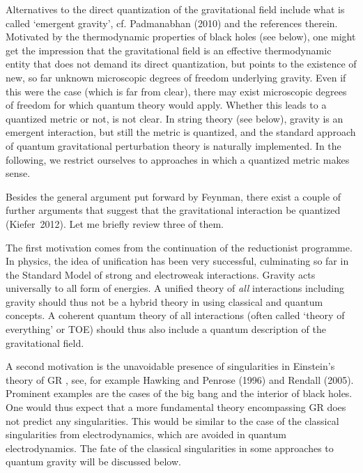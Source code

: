 \documentclass[12pt]{article}
\begin{document}
Alternatives to the direct quantization of the gravitational field
include what is called `emergent gravity', cf. Padmanabhan (2010) and
the references therein. Motivated by the thermodynamic properties of
black holes (see below), one might get the impression that the
gravitational field is an effective thermodynamic entity that does
not demand its direct quantization, but points to the existence of
new, so far unknown microscopic degrees of freedom underlying
gravity. Even if this were the case (which is far from clear), there
may exist microscopic degrees of freedom for which quantum theory
would apply. Whether this leads to a quantized metric or not, is not
clear. In string theory (see below), gravity is an
emergent interaction, but still the metric is quantized, and the standard
approach of quantum 
gravitational perturbation theory is naturally implemented.  
In the following, we restrict ourselves to approaches in which a
quantized metric makes sense.

Besides the general argument put forward by Feynman, there exist a
couple of further arguments that suggest that the gravitational interaction
be quantized (Kiefer~2012). Let me briefly review three of them.

The first motivation comes from the continuation of the reductionist
programme. In physics, the idea of unification has been very
successful, culminating so far in the Standard Model of strong and
electroweak interactions. Gravity acts universally to all form of
energies. A unified theory of {\em all} interactions including gravity
should thus not be a hybrid theory in using classical and quantum
concepts. A coherent quantum theory of all interactions (often called
`theory of everything' or TOE) should thus also include a quantum
description of the gravitational field. 

A second motivation is the unavoidable presence of singularities in
Einstein's theory of GR , see, for example Hawking and Penrose (1996)
and Rendall (2005). Prominent examples are the cases of the big bang
and the interior of black holes. 
One would thus expect that a more fundamental
theory encompassing GR does not predict any singularities. This would
be similar to the case of the classical singularities from
electrodynamics, which are avoided in quantum electrodynamics.
The fate of
the classical singularities in some approaches to quantum gravity 
will be discussed below.
\end{document}
